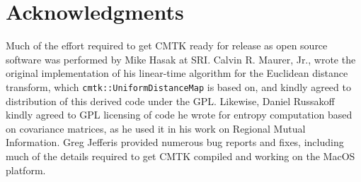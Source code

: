 \documentclass{InsightArticle}
\begin{document}
\section*{Acknowledgments}

Much of the effort required to get CMTK ready for release as open source
software was performed by Mike Hasak at SRI. Calvin R. Maurer, Jr., wrote the
original implementation of his linear-time algorithm for the Euclidean
distance transform, which \verb|cmtk::UniformDistanceMap| is based on, and
kindly agreed to distribution of this derived code under the GPL. Likewise,
Daniel Russakoff kindly agreed to GPL licensing of code he wrote for entropy
computation based on covariance matrices, as he used it in his work on
Regional Mutual Information. Greg Jefferis provided numerous bug reports and
fixes, including much of the details required to get CMTK compiled and working
on the MacOS platform.

%
%



\end{document}
